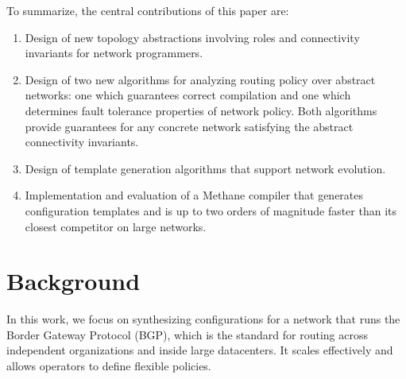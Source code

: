 \documentclass{sig-alternate-10pt}
\newcommand{\sysname}{{\small \sf Methane}\xspace}
\begin{document}
To summarize, the central contributions of this paper are:

\begin{enumerate}
\item Design of new topology abstractions involving roles and
connectivity invariants for network programmers.
\item Design of two new algorithms for analyzing routing policy over
abstract networks: one which
guarantees correct compilation and one which determines fault tolerance
properties of network policy.  Both algorithms provide guarantees for any
concrete network satisfying the abstract connectivity invariants.
\item Design of template generation algorithms that support network
evolution.
\item Implementation and evaluation of a \sysname compiler that generates
configuration templates and is up to two orders of magnitude faster
than its closest competitor on large networks.
\end{enumerate}




%
%
%
%

\section{Background}
\label{sec:background}

In this work, we focus on synthesizing configurations for a network that runs the Border Gateway Protocol (BGP), which is the standard for routing across independent organizations and inside large datacenters. It scales effectively and allows operators to define flexible policies.
\end{document}
